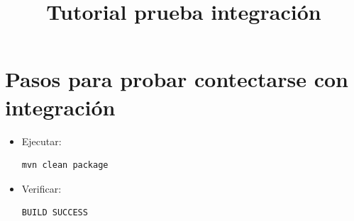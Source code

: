 \documentclass[12pt]{article}
\title{Tutorial prueba integraci\'on}
\begin{document}
\maketitle
\clearpage
\section{Pasos para probar contectarse con integraci\'on}

\begin{itemize}
\item Ejecutar: %
\begin{verbatim}
mvn clean package
\end{verbatim}

\begin{minipage}[t]{\linewidth}
          \raggedright

          \medskip
          
    \end{minipage}
\item Verificar: %
\begin{verbatim}
BUILD SUCCESS
\end{verbatim}
\begin{minipage}[t]{\linewidth}
          \raggedright


\end{minipage}
\end{itemize}
\end{document}

